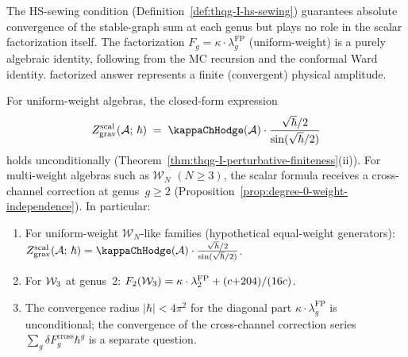 \begin{remark}
\label{rem:hs-sewing-factorization}
The HS-sewing condition
(Definition~\ref{def:thqg-I-hs-sewing}) guarantees absolute
convergence of the stable-graph sum at each genus but plays no
role in the scalar factorization itself. The factorization
$F_g = \kappa \cdot \lambda_g^{\mathrm{FP}}$
\textup{(}uniform-weight\textup{)} is a purely
algebraic identity, following from the MC recursion and the
conformal Ward identity. %
factorized answer represents a finite (convergent) physical
amplitude.
\end{remark}

\begin{corollary}
\label{cor:scalar-lane-upgrade}
For uniform-weight algebras, the closed-form expression
\begin{equation}\label{eq:upgraded-scalar}
Z_{\mathrm{grav}}^{\mathrm{scal}}(\cA;\,\hbar)
\;=\; \kappaChHodge(\cA) \cdot
\frac{\sqrt{\hbar}/2}{\sin(\sqrt{\hbar}/2)}
\end{equation}
holds unconditionally
\textup{(}Theorem~\textup{\ref{thm:thqg-I-perturbative-finiteness}(ii))}.
For multi-weight algebras such as\/ $\mathcal{W}_N$
$(N \geq 3)$, the scalar formula receives a cross-channel
correction at genus~$g \geq 2$
\textup{(}Proposition~\textup{\ref{prop:degree-0-weight-independence})}.
In particular:
\begin{enumerate}[label=\textup{(\roman*)}]
\item For uniform-weight $\mathcal{W}_N$-like families \textup{(}hypothetical
 equal-weight generators\textup{)}:
 $Z_{\mathrm{grav}}^{\mathrm{scal}}(\cA;\,\hbar) = \kappaChHodge(\cA) \cdot
 \frac{\sqrt{\hbar}/2}{\sin(\sqrt{\hbar}/2)}$.
\item For $\mathcal{W}_3$ at genus~$2$: $F_2(\mathcal{W}_3) = \kappa \cdot
 \lambda_2^{\mathrm{FP}} + (c{+}204)/(16c)$.
\item The convergence radius $|\hbar| < 4\pi^2$ for the
 diagonal part $\kappa \cdot \lambda_g^{\mathrm{FP}}$ is
 unconditional; the convergence of the cross-channel
 correction series $\sum_g \delta F_g^{\mathrm{cross}} \hbar^g$
 is a separate question.
\end{enumerate}
\end{corollary}

